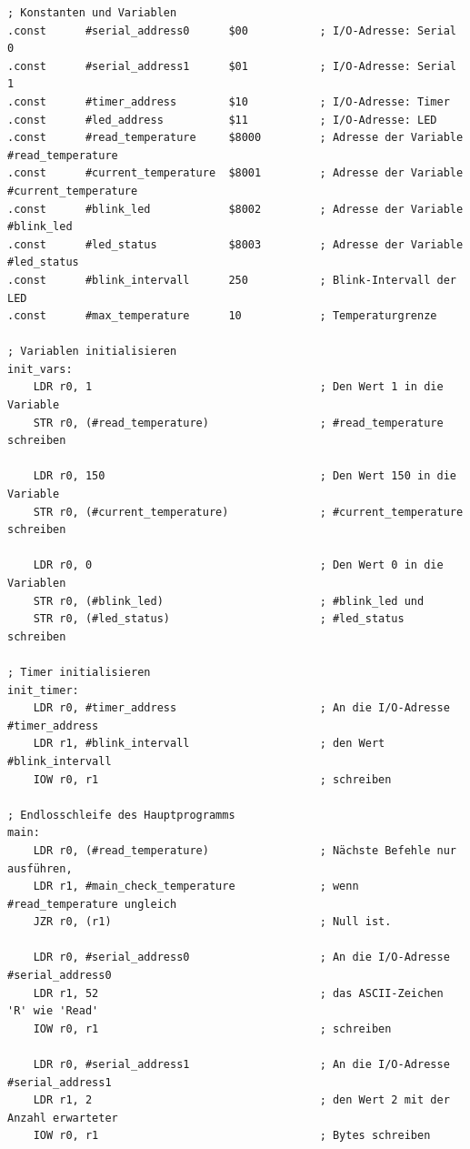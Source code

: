{
\footnotesize

\begin{verbatim}
; Konstanten und Variablen
.const      #serial_address0      $00           ; I/O-Adresse: Serial 0
.const      #serial_address1      $01           ; I/O-Adresse: Serial 1
.const      #timer_address        $10           ; I/O-Adresse: Timer
.const      #led_address          $11           ; I/O-Adresse: LED
.const      #read_temperature     $8000         ; Adresse der Variable #read_temperature
.const      #current_temperature  $8001         ; Adresse der Variable #current_temperature
.const      #blink_led            $8002         ; Adresse der Variable #blink_led
.const      #led_status           $8003         ; Adresse der Variable #led_status
.const      #blink_intervall      250           ; Blink-Intervall der LED
.const      #max_temperature      10            ; Temperaturgrenze

; Variablen initialisieren
init_vars:
    LDR r0, 1                                   ; Den Wert 1 in die Variable
    STR r0, (#read_temperature)                 ; #read_temperature schreiben

    LDR r0, 150                                 ; Den Wert 150 in die Variable
    STR r0, (#current_temperature)              ; #current_temperature schreiben

    LDR r0, 0                                   ; Den Wert 0 in die Variablen
    STR r0, (#blink_led)                        ; #blink_led und
    STR r0, (#led_status)                       ; #led_status schreiben

; Timer initialisieren
init_timer:
    LDR r0, #timer_address                      ; An die I/O-Adresse #timer_address
    LDR r1, #blink_intervall                    ; den Wert #blink_intervall
    IOW r0, r1                                  ; schreiben

; Endlosschleife des Hauptprogramms
main:
    LDR r0, (#read_temperature)                 ; Nächste Befehle nur ausführen,
    LDR r1, #main_check_temperature             ; wenn #read_temperature ungleich
    JZR r0, (r1)                                ; Null ist.

    LDR r0, #serial_address0                    ; An die I/O-Adresse #serial_address0
    LDR r1, 52                                  ; das ASCII-Zeichen 'R' wie 'Read'
    IOW r0, r1                                  ; schreiben

    LDR r0, #serial_address1                    ; An die I/O-Adresse #serial_address1
    LDR r1, 2                                   ; den Wert 2 mit der Anzahl erwarteter
    IOW r0, r1                                  ; Bytes schreiben


\end{verbatim}}
